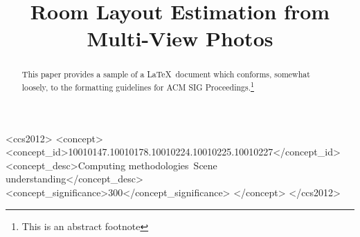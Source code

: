 \documentclass[sigconf]{acmart}
\newcommand{\comments}[1]{}
\begin{document}
\title{Room Layout Estimation from Multi-View Photos}

\comments{
\author{Ruifeng Deng}
\orcid{1234-5678-9012}
\affiliation{%
  \institution{University of Science and Technology of China}
  \streetaddress{P.O. Box 1212}
  \city{Hefei}
  \country{China}
  \postcode{43017-6221}
}
\email{trovato@corporation.com}

\author{Chaoyu Xie}
\affiliation{%
  \institution{University of Science and Technology of China}
  \streetaddress{P.O. Box 1212}
  \city{Hefei}
  \country{China}
  \postcode{43017-6221}
}
\email{webmaster@marysville-ohio.com}

\author{Xuejin Chen}
\affiliation{%
  \institution{University of Science and Technology of China}
  \streetaddress{1 Th{\o}rv{\"a}ld Circle}
  \city{Hefei}
  \country{China}}
\email{larst@affiliation.org}


\renewcommand{\shortauthors}{B. Trovato et al.}
}

\begin{abstract}
This paper provides a sample of a \LaTeX\ document which conforms,
somewhat loosely, to the formatting guidelines for
ACM SIG Proceedings.\footnote{This is an abstract footnote}
\vspace{4cm}
\end{abstract}

%
%
\begin{CCSXML}
	<ccs2012>
	<concept>
	<concept_id>10010147.10010178.10010224.10010225.10010227</concept_id>
	<concept_desc>Computing methodologies~Scene understanding</concept_desc>
	<concept_significance>300</concept_significance>
	</concept>
	</ccs2012>
\end{CCSXML}





\maketitle




%



\end{document}
